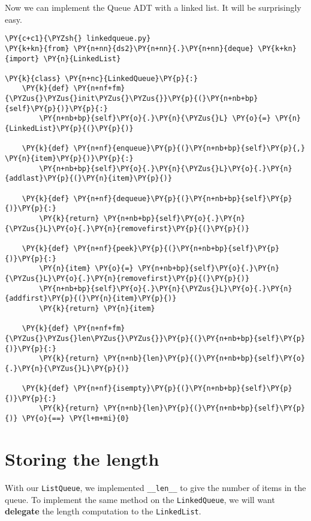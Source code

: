 Now we can implement the Queue ADT with a linked list.
It will be surprisingly easy.

\begin{Verbatim}[commandchars=\\\{\}]
\PY{c+c1}{\PYZsh{} linkedqueue.py}
\PY{k+kn}{from} \PY{n+nn}{ds2}\PY{n+nn}{.}\PY{n+nn}{deque} \PY{k+kn}{import} \PY{n}{LinkedList}

\PY{k}{class} \PY{n+nc}{LinkedQueue}\PY{p}{:}
    \PY{k}{def} \PY{n+nf+fm}{\PYZus{}\PYZus{}init\PYZus{}\PYZus{}}\PY{p}{(}\PY{n+nb+bp}{self}\PY{p}{)}\PY{p}{:}
        \PY{n+nb+bp}{self}\PY{o}{.}\PY{n}{\PYZus{}L} \PY{o}{=} \PY{n}{LinkedList}\PY{p}{(}\PY{p}{)}

    \PY{k}{def} \PY{n+nf}{enqueue}\PY{p}{(}\PY{n+nb+bp}{self}\PY{p}{,} \PY{n}{item}\PY{p}{)}\PY{p}{:}
        \PY{n+nb+bp}{self}\PY{o}{.}\PY{n}{\PYZus{}L}\PY{o}{.}\PY{n}{addlast}\PY{p}{(}\PY{n}{item}\PY{p}{)}

    \PY{k}{def} \PY{n+nf}{dequeue}\PY{p}{(}\PY{n+nb+bp}{self}\PY{p}{)}\PY{p}{:}
        \PY{k}{return} \PY{n+nb+bp}{self}\PY{o}{.}\PY{n}{\PYZus{}L}\PY{o}{.}\PY{n}{removefirst}\PY{p}{(}\PY{p}{)}

    \PY{k}{def} \PY{n+nf}{peek}\PY{p}{(}\PY{n+nb+bp}{self}\PY{p}{)}\PY{p}{:}
        \PY{n}{item} \PY{o}{=} \PY{n+nb+bp}{self}\PY{o}{.}\PY{n}{\PYZus{}L}\PY{o}{.}\PY{n}{removefirst}\PY{p}{(}\PY{p}{)}
        \PY{n+nb+bp}{self}\PY{o}{.}\PY{n}{\PYZus{}L}\PY{o}{.}\PY{n}{addfirst}\PY{p}{(}\PY{n}{item}\PY{p}{)}
        \PY{k}{return} \PY{n}{item}

    \PY{k}{def} \PY{n+nf+fm}{\PYZus{}\PYZus{}len\PYZus{}\PYZus{}}\PY{p}{(}\PY{n+nb+bp}{self}\PY{p}{)}\PY{p}{:}
        \PY{k}{return} \PY{n+nb}{len}\PY{p}{(}\PY{n+nb+bp}{self}\PY{o}{.}\PY{n}{\PYZus{}L}\PY{p}{)}

    \PY{k}{def} \PY{n+nf}{isempty}\PY{p}{(}\PY{n+nb+bp}{self}\PY{p}{)}\PY{p}{:}
        \PY{k}{return} \PY{n+nb}{len}\PY{p}{(}\PY{n+nb+bp}{self}\PY{p}{)} \PY{o}{==} \PY{l+m+mi}{0}
\end{Verbatim}


\section{Storing the length}


With our \texttt{ListQueue}, we implemented \texttt{\_\_len\_\_} to give the number of items in the queue.
To implement the same method on the \texttt{LinkedQueue}, we will want \textbf{delegate} the length computation to the \texttt{LinkedList}.


